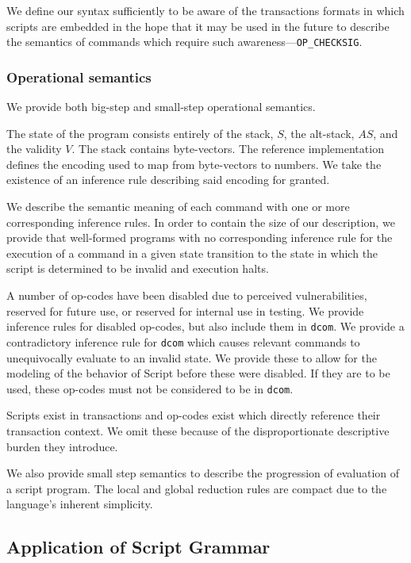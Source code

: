 \documentclass[letterpaper, 10 pt, conference]{ieeeconf}
\begin{document}
We define our syntax sufficiently to be aware of the transactions formats in which scripts are embedded in the hope that it may be used in the future to describe the semantics of commands which require such awareness---\texttt{OP\_CHECKSIG}.

\subsubsection{Operational semantics}

We provide both big-step and small-step operational semantics.

The state of the program consists entirely of the stack, $S$, the alt-stack, $AS$, and the validity $V$. The stack contains byte-vectors. The reference implementation defines the encoding used to map from byte-vectors to numbers. We take the existence of an inference rule describing said encoding for granted.

We describe the semantic meaning of each command with one or more corresponding inference rules. In order to contain the size of our description, we provide that well-formed programs with no corresponding inference rule for the execution of a command in a given state transition to the state in which the script is determined to be invalid and execution halts.

A number of op-codes have been disabled due to perceived vulnerabilities, reserved for future use, or reserved for internal use in testing. We provide inference rules for disabled op-codes, but also include them in \texttt{dcom}. We provide a contradictory inference rule for \texttt{dcom} which causes relevant commands to unequivocally evaluate to an invalid state. We provide these to allow for the modeling of the behavior of Script before these were disabled. If they are to be used, these op-codes must not be considered to be in \texttt{dcom}.

Scripts exist in transactions and op-codes exist which directly reference their transaction context. We omit these because of the disproportionate descriptive burden they introduce.

We also provide small step semantics to describe the progression of evaluation of a script program. The local and global reduction rules are compact due to the language's inherent simplicity.

\subsection{Application of Script Grammar}
\end{document}

